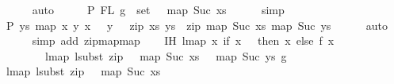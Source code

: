\begin{isabellebody}
\ \ \ \ \isamarkupfalse%
\ auto\isanewline
\ \ \isamarkupfalse%
\ \isamarkupfalse%
\ P{}{\isacharcolon}{\kern0pt}\ {\isachardoublequoteopen}FL\ g\ {\isasymsubseteq}\ set\ {\isacharparenleft}{\kern0pt}{}\ {\isacharhash}{\kern0pt}\ map\ Suc\ xs{\isacharparenright}{\kern0pt}{\isachardoublequoteclose}\isanewline
\ \ \ \ \isamarkupfalse%
\ simp\isanewline
\isanewline
\ \ \isamarkupfalse%
\ P{}{\isacharcolon}{\kern0pt}\ {\isachardoublequoteopen}{\isasymforall}ys{\isachardot}{\kern0pt}\ map\ {\isacharparenleft}{\kern0pt}{\isasymlambda}{\isacharparenleft}{\kern0pt}x{\isacharcomma}{\kern0pt}\ y{\isacharparenright}{\kern0pt}{\isachardot}{\kern0pt}\ {\isacharparenleft}{\kern0pt}x\ {\isacharplus}{\kern0pt}\ {}{\isacharcomma}{\kern0pt}\ y\ {\isacharplus}{\kern0pt}\ {}{\isacharparenright}{\kern0pt}{\isacharparenright}{\kern0pt}\ {\isacharparenleft}{\kern0pt}zip\ xs\ ys{\isacharparenright}{\kern0pt}\ {\isacharequal}{\kern0pt}\ zip\ {\isacharparenleft}{\kern0pt}map\ Suc\ xs{\isacharparenright}{\kern0pt}\ {\isacharparenleft}{\kern0pt}map\ Suc\ ys{\isacharparenright}{\kern0pt}{\isachardoublequoteclose}\isanewline
\ \ \ \ \isamarkupfalse%
\ auto\isanewline
\ \ \ \ \isamarkupfalse%
\ {\isacharparenleft}{\kern0pt}simp\ add{\isacharcolon}{\kern0pt}\ zip{\isacharunderscore}{\kern0pt}map{\isacharunderscore}{\kern0pt}map{\isacharparenright}{\kern0pt}\isanewline
\isanewline
\ \ \isamarkupfalse%
\ IH{\isacharcolon}{\kern0pt}\ {\isachardoublequoteopen}lmap\ {\isacharparenleft}{\kern0pt}{\isasymlambda}x{\isachardot}{\kern0pt}\ if\ x\ {\isacharequal}{\kern0pt}\ {}\ then\ x\ else\ {\isacharparenleft}{\kern0pt}f\ {\isacharparenleft}{\kern0pt}x\ {\isacharminus}{\kern0pt}\ {}{\isacharparenright}{\kern0pt}\ {\isacharplus}{\kern0pt}\ {}{\isacharparenright}{\kern0pt}{\isacharparenright}{\kern0pt}\isanewline
\ \ \ \ \ \ \ \ {\isacharparenleft}{\kern0pt}lmap\ {\isacharparenleft}{\kern0pt}lsubst\ {\isacharparenleft}{\kern0pt}zip\ {\isacharparenleft}{\kern0pt}{}\ {\isacharhash}{\kern0pt}\ map\ Suc\ xs{\isacharparenright}{\kern0pt}\ {\isacharparenleft}{\kern0pt}{}\ {\isacharhash}{\kern0pt}\ map\ Suc\ ys{\isacharparenright}{\kern0pt}{\isacharparenright}{\kern0pt}{\isacharparenright}{\kern0pt}\ g{\isacharparenright}{\kern0pt}\ {\isacharequal}{\kern0pt}\isanewline
\ lmap\ {\isacharparenleft}{\kern0pt}lsubst\ {\isacharparenleft}{\kern0pt}zip\ {\isacharparenleft}{\kern0pt}{}\ {\isacharhash}{\kern0pt}\ map\ Suc\ xs{\isacharparenright}{\kern0pt}\isanewline

\end{isabellebody}

